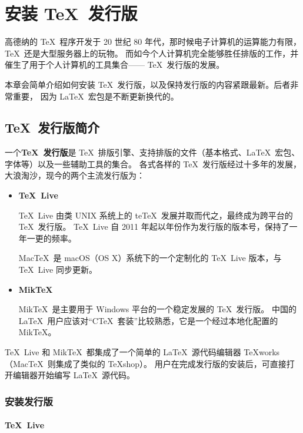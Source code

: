 \chapter{安装 \protect\TeX\ 发行版}\label{app:install}

\begin{intro}
高德纳的 \TeX\ 程序开发于 20 世纪 80 年代，那时候电子计算机的运算能力有限，\TeX\ 还是大型服务器上的玩物。
而如今个人计算机完全能够胜任排版的工作，并催生了用于个人计算机的工具集合—— \TeX\ 发行版的发展。

本章会简单介绍如何安装 \TeX\ 发行版，以及保持发行版的内容紧跟最新。后者非常重要，
因为 \LaTeX\ 宏包是不断更新换代的。
\end{intro}

\section{\protect\TeX\ 发行版简介}\label{sec:dists}

一个\textbf{\TeX\ 发行版}是 \TeX\ 排版引擎、支持排版的文件（基本格式、\LaTeX\ 宏包、字体等）以及一些辅助工具的集合。
各式各样的 \TeX\ 发行版经过十多年的发展，大浪淘沙，现今的两个主流发行版为：
\begin{itemize}
  \item \textbf{\TeX\ Live}\par
  \TeX\ Live 由类 UNIX 系统上的 te\TeX\ 发展并取而代之，最终成为跨平台的 \TeX\ 发行版。
  \TeX\ Live 自 2011 年起以年份作为发行版的版本号，保持了一年一更的频率。

  Mac\TeX\ 是 macOS（OS X）系统下的一个定制化的 \TeX\ Live 版本，与 \TeX\ Live 同步更新。

  \item \textbf{Mik\TeX}\par
  Mik\TeX\ 是主要用于 Windows 平台的一个稳定发展的 \TeX\ 发行版。
  中国的 \LaTeX\ 用户应该对“C\TeX\ 套装”比较熟悉，它是一个经过本地化配置的 Mik\TeX 。
\end{itemize}

\TeX\ Live 和 Mik\TeX\ 都集成了一个简单的 \LaTeX\ 源代码编辑器 \TeX works（Mac\TeX\ 则集成了类似的 \TeX shop）。
用户在完成发行版的安装后，可直接打开编辑器开始编写 \LaTeX\ 源代码。

\subsection{安装发行版}\label{subsec:install-dists}

\subsubsection{\TeX\ Live}

